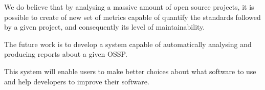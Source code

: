 \documentclass[sle]{llncs}
\begin{document}
We do believe that by analysing a massive amount of open source projects,
it is possible to create of new set of metrics capable of quantify the standards followed by a given project, 
and consequently its level of maintainability.

The future work is to develop a system capable of automatically analysing and producing reports about a given OSSP.

This system will enable users to make better choices about what software to use and help developers to improve their software.





\end{document}
